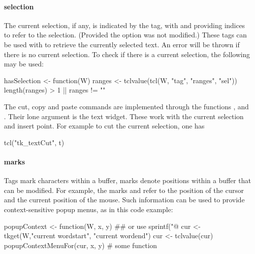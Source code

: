 \paragraph{selection}
The current selection, if any, is indicated by the  tag,
with  and  providing indices to refer
to the selection. (Provided the option  was not
modified.) These tags can be used with  to retrieve the
currently selected text. An error will be thrown if there is no
current selection. To check if there is a current selection, the following may be used:
\begin{Schunk}
\begin{Sinput}
 hasSelection <- function(W) {
   ranges <- tclvalue(tcl(W, "tag", "ranges", "sel"))
   length(ranges) > 1 || ranges != ""
 }
\end{Sinput}
\end{Schunk}

The cut, copy and paste commands are implemented through the functions
,  and
. Their lone argument is the text widget. These
work with the current selection and insert point. For example to cut
the current selection, one has
\begin{Schunk}
\begin{Sinput}
 tcl("tk_textCut", t)
\end{Sinput}
\end{Schunk}

\paragraph{marks}
Tags mark characters within a buffer, marks denote positions within a
buffer that can be modified. For example, the marks  and
 refer to the position of the cursor and the current
position of the mouse. Such information can be used to provide
context-sensitive popup menus, as in this code example:
\begin{Schunk}
\begin{Sinput}
 popupContext <- function(W, x, y) {
   ## or use sprintf("@%
   cur <- tkget(W,"current  wordstart", "current wordend") 
   cur <- tclvalue(cur)
   popupContextMenuFor(cur, x, y)        # some function
 }
\end{Sinput}
\end{Schunk}

